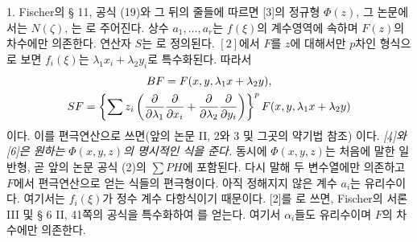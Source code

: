 1. Fischer의 § 11, 공식 (19)와 그 뒤의 줄들에 따르면 [3]의 정규형 \(\Phi(z)\), 그 논문에서는 \(N(\zeta)\), 는
로 주어진다. 상수 \(a_1,\ldots,a_r\)는 \(f(\xi)\)의 계수영역에 속하며 \(F(z)\)의 차수에만 의존한다. 연산자 \(S\)는
로 정의된다.
\([2]\)에서 \(F\)를 \(z\)에 대해서만 \(p\)차인 형식으로 보면 \(f_i(\xi)\)는 \(\lambda_1x_i+\lambda_2y_i\)로 특수화된다. 따라서
\[
\begin{gathered}
BF=F(x,y,\lambda_1x+\lambda_2y),\\
SF=\left\{\sum z_i\left(\frac{\partial}{\partial\lambda_1}\frac{\partial}{\partial x_i}+
\frac{\partial}{\partial\lambda_2}\frac{\partial}{\partial y_i}\right)\right\}^{p}
F(x,y,\lambda_1x+\lambda_2y)
\end{gathered}
\]
이다. 이를 편극연산으로 쓰면(앞의 논문 II, 2와 3 및 그곳의 약기법 참조)
이다. \emph{[4]와 [6]은 원하는 \(\Phi(x,y,z)\)의 명시적인 식을 준다.} 동시에 \(\Phi(x,y,z)\)는 처음에 말한 일반형, 곧 앞의 논문 공식 (2)의 \(\sum PH\)에 포함된다. 다시 말해 두 변수열에만 의존하고 \(F\)에서 편극연산으로 얻는 식들의 편극형이다. 아직 정해지지 않은 계수 \(a_i\)는 유리수이다. 여기서는 \(f_i(\xi)\)가 정수 계수 다항식이기 때문이다. [2]를
로 쓰면, Fischer의 서론 III 및 § 6 II, 41쪽의 공식을 특수화하여
를 얻는다. 여기서 \(\alpha_i\)들도 유리수이며 \(F\)의 차수에만 의존한다.

